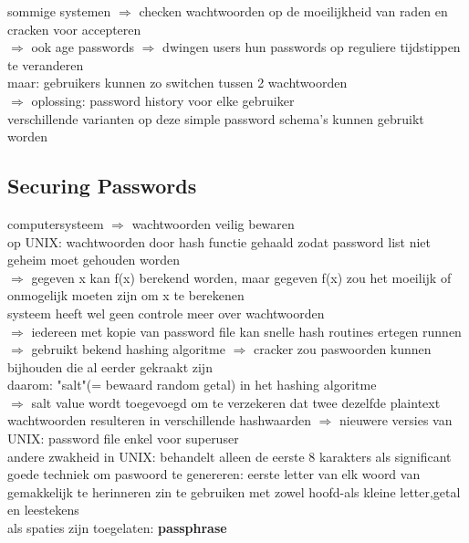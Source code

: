 \documentclass{report}
\begin{document}
sommige systemen $\Rightarrow$ checken wachtwoorden op de moeilijkheid van raden en cracken voor accepteren
\\$\Rightarrow$ ook age passwords $\Rightarrow$ dwingen users hun passwords op reguliere tijdstippen te veranderen
\\maar: gebruikers kunnen zo switchen tussen 2 wachtwoorden
\\$\Rightarrow$ oplossing: password history voor elke gebruiker
\\ verschillende varianten op deze simple password schema's kunnen gebruikt worden

\subsection{Securing Passwords}
computersysteem $\Rightarrow$ wachtwoorden veilig bewaren
\\ op UNIX: wachtwoorden door hash functie gehaald zodat password list niet geheim moet gehouden worden
\\ $\Rightarrow$ gegeven x kan f(x) berekend worden, maar gegeven f(x) zou het moeilijk of onmogelijk moeten zijn om x te berekenen
\\systeem heeft wel geen controle meer over wachtwoorden
\\$\Rightarrow$ iedereen met kopie van password file kan snelle hash routines ertegen runnen
\\$\Rightarrow$ gebruikt bekend hashing algoritme $\Rightarrow$ cracker zou paswoorden kunnen bijhouden die al eerder gekraakt zijn
\\daarom: "salt"(= bewaard random getal) in het hashing algoritme
\\$\Rightarrow$ salt value wordt toegevoegd om te verzekeren dat twee dezelfde plaintext wachtwoorden resulteren in verschillende hashwaarden
$\Rightarrow$ nieuwere versies van UNIX: password file enkel voor superuser
\\ andere zwakheid in UNIX: behandelt alleen de eerste 8 karakters als significant 
\\goede techniek om paswoord te genereren:
eerste letter van elk woord van gemakkelijk te herinneren zin te gebruiken met zowel hoofd-als kleine letter,getal en leestekens
\\ als spaties zijn toegelaten: \textbf{passphrase}
\end{document}

